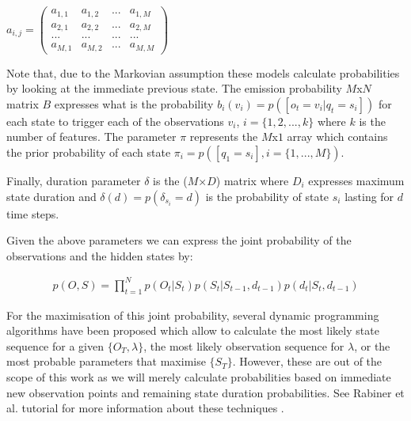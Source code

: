 \documentclass[conference]{IEEEtran}
\begin{document}
\begin{centering}
\vspace{0.2cm}
$a_{i,j} = \left( \begin{smallmatrix} a_{1,1}&a_{1,2}&...&a_{1,M}\\ a_{2,1}&a_{2,2}&...&a_{2,M}\\
...&...&...&...\\
a_{M,1}&a_{M,2}&...&a_{M,M} \end{smallmatrix} \right)$
\vspace{0.2cm} 
\end{centering}

Note that, due to the Markovian assumption these models calculate probabilities by looking at the immediate previous state. The emission probability $M$x$N$ matrix $B$ expresses what is the probability $b_{i}(v_i)=p([o_t=v_i|q_{t}=s_i])$ for each state to trigger each of the observations $v_i$, $i=\{1,2,...,k\}$ where $k$ is the number of features. The parameter $\pi$ represents the $M$x$1$ array which contains the prior probability of each state $\pi_i=p([q_{1}=s_i], i=\{1,...,M\})$. 

Finally, duration parameter $\delta$ is the ($M$×$D$) matrix where $D_i$ expresses maximum state duration and $\delta(d)=p(\delta_{s_i}=d)$ is the probability
of state $s_i$ lasting for $d$ time steps. 

Given the above parameters we can express the joint probability of the observations and the hidden states by:

\begin{gather*} 
p(O,S)= \prod_{t=1}^{N}p(O_{t}|S_{t})p(S_{t}|S_{t-1},d_{t-1})p(d_{t}|S_{t},d_{t-1})
\end{gather*}

For the maximisation of this joint probability, several dynamic programming algorithms have been proposed which allow to calculate the most likely state sequence for a given $\{O_T,\lambda\}$, the most likely observation sequence for $\lambda$, or the most probable parameters that maximise $\{S_T\}$. However, these are out of the scope of this work as we will merely calculate probabilities based on immediate new observation points and remaining state duration probabilities. See Rabiner et al. tutorial for  more information about these techniques \cite{Rabiner1989}.
\end{document}
